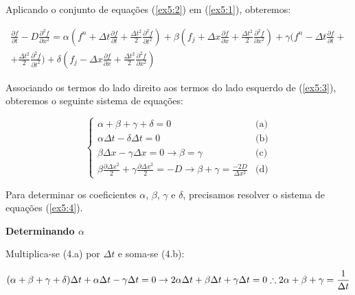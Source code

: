 \documentclass[11pt]{article}
\begin{document}
Aplicando o conjunto de equações (\ref{ex5:2}) em (\ref{ex5:1}),
obteremos:

\begin{equation}
\begin{aligned}
    \frac{\partial{f}}{\partial{t}} - D\frac{\partial^2{f}}{\partial{x^2}} =
    \alpha (f^{n} + \Delta{t}\frac{\partial{f}}{\partial{t}} + \frac{\Delta{t}^2}{2}\frac{\partial^2{f}}{\partial{t^2}}) +
    \beta (f_{j} + \Delta{x}\frac{\partial{f}}{\partial{x}} + \frac{\Delta{t}^2}{2}\frac{\partial^2{f}}{\partial{x^2}}) +
    \gamma (f^{n} - \Delta{t}\frac{\partial{f}}{\partial{t}} + \\ + \frac{\Delta{t}^2}{2}\frac{\partial^2{f}}{\partial{t^2}}) +
    \delta (f_{j} - \Delta{x}\frac{\partial{f}}{\partial{x}} + \frac{\Delta{t}^2}{2}\frac{\partial^2{f}}{\partial{x^2}})
\end{aligned}
    \label{ex5:3}
\end{equation}

Associando os termos do lado direito aos termos do lado esquerdo de
(\ref{ex5:3}), obteremos o seguinte sistema de equações:

\begin{equation}
  \begin{cases}
    \alpha + \beta + \gamma + \delta = 0 & \text{(a)}\\
    \alpha \Delta{t} - \delta \Delta{t} = 0  & \text{(b)} \\
    \beta \Delta{x} - \gamma \Delta{x} = 0 \to \beta = \gamma & \text{(c)}\\
    \beta \frac{\partial{\Delta{x^2}}}{2} + \gamma \frac{\partial{\Delta{x^2}}}{2} = -D \to \beta + \gamma = \frac{-2D}{\Delta{x^2}} & \text{(d)}
  \end{cases}
  \label{ex5:4}
\end{equation}

Para determinar os coeficientes \(\alpha\), \(\beta\), \(\gamma\) e
\(\delta\), precisamos resolver o sistema de equações (\ref{ex5:4}).

\textbf{Determinando \(\alpha\)}

Multiplica-se (4.a) por \(\Delta{t}\) e soma-se (4.b):

\begin{equation}
    (\alpha + \beta + \gamma + \delta)\Delta{t} + \alpha \Delta{t} - \gamma \Delta{t} = 0 \to 2\alpha{\Delta{t}} + \beta{\Delta{t}} + \gamma{\Delta{t}} = 0 \\
    \therefore 2\alpha + \beta + \gamma = \frac{1}{\Delta{t}}
    \label{ex5:5}
\end{equation}
\end{document}
